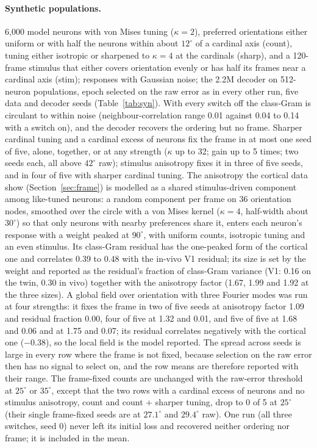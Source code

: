 \documentclass[11pt]{article}
\begin{document}
\paragraph{Synthetic populations.} 6,000 model neurons with von Mises tuning ($\kappa = 2$), preferred orientations either uniform or with half the neurons within about $12^\circ$ of a cardinal axis (count), tuning either isotropic or sharpened to $\kappa = 4$ at the cardinals (sharp), and a 120-frame stimulus that either covers orientation evenly or has half its frames near a cardinal axis (stim); responses with Gaussian noise; the 2.2M decoder on 512-neuron populations, epoch selected on the raw error as in every other run, five data and decoder seeds (Table~\ref{tab:syn}). With every switch off the class-Gram is circulant to within noise (neighbour-correlation range 0.01 against 0.04 to 0.14 with a switch on), and the decoder recovers the ordering but no frame. Sharper cardinal tuning and a cardinal excess of neurons fix the frame in at most one seed of five, alone, together, or at any strength ($\kappa$ up to 32; gain up to 5 times; two seeds each, all above $42^\circ$ raw); stimulus anisotropy fixes it in three of five seeds, and in four of five with sharper cardinal tuning. The anisotropy the cortical data show (Section~\ref{sec:frame}) is modelled as a shared stimulus-driven component among like-tuned neurons: a random component per frame on 36 orientation nodes, smoothed over the circle with a von Mises kernel ($\kappa = 4$, half-width about $30^\circ$) so that only neurons with nearby preferences share it, enters each neuron's response with a weight peaked at $90^\circ$, with uniform counts, isotropic tuning and an even stimulus. Its class-Gram residual has the one-peaked form of the cortical one and correlates 0.39 to 0.48 with the in-vivo V1 residual; its size is set by the weight and reported as the residual's fraction of class-Gram variance (V1: 0.16 on the twin, 0.30 in vivo) together with the anisotropy factor (1.67, 1.99 and 1.92 at the three sizes). A global field over orientation with three Fourier modes was run at four strengths: it fixes the frame in two of five seeds at anisotropy factor 1.09 and residual fraction 0.00, four of five at 1.32 and 0.01, and five of five at 1.68 and 0.06 and at 1.75 and 0.07; its residual correlates negatively with the cortical one ($-0.38$), so the local field is the model reported. The spread across seeds is large in every row where the frame is not fixed, because selection on the raw error then has no signal to select on, and the row means are therefore reported with their range. The frame-fixed counts are unchanged with the raw-error threshold at $25^\circ$ or $35^\circ$, except that the two rows with a cardinal excess of neurons and no stimulus anisotropy, count and count + sharper tuning, drop to 0 of 5 at $25^\circ$ (their single frame-fixed seeds are at $27.1^\circ$ and $29.4^\circ$ raw). One run (all three switches, seed 0) never left its initial loss and recovered neither ordering nor frame; it is included in the mean.
\end{document}
